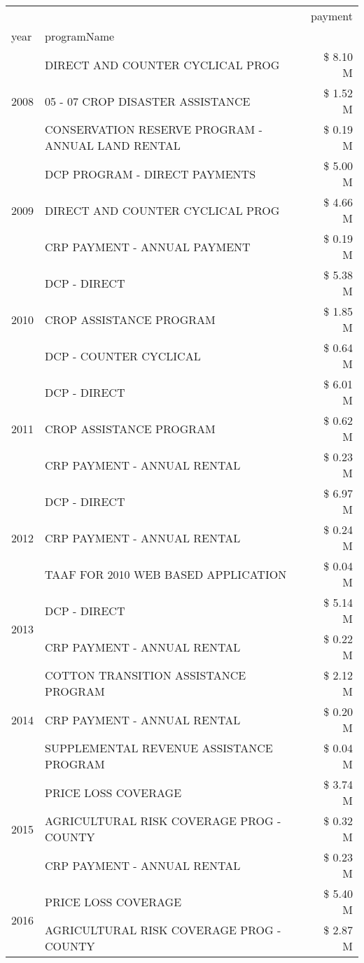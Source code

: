 \begin{tabular}{llr}
\toprule
 &  & payment \\
year & programName &  \\
\midrule
\multirow[t]{3}{*}{2008} & DIRECT AND COUNTER CYCLICAL PROG & \$ 8.10 M \\
 & 05 - 07 CROP DISASTER ASSISTANCE & \$ 1.52 M \\
 & CONSERVATION RESERVE PROGRAM - ANNUAL LAND RENTAL & \$ 0.19 M \\
\cline{1-3}
\multirow[t]{3}{*}{2009} & DCP PROGRAM - DIRECT PAYMENTS & \$ 5.00 M \\
 & DIRECT AND COUNTER CYCLICAL PROG & \$ 4.66 M \\
 & CRP PAYMENT - ANNUAL PAYMENT & \$ 0.19 M \\
\cline{1-3}
\multirow[t]{3}{*}{2010} & DCP - DIRECT & \$ 5.38 M \\
 & CROP ASSISTANCE PROGRAM & \$ 1.85 M \\
 & DCP - COUNTER CYCLICAL & \$ 0.64 M \\
\cline{1-3}
\multirow[t]{3}{*}{2011} & DCP - DIRECT & \$ 6.01 M \\
 & CROP ASSISTANCE PROGRAM & \$ 0.62 M \\
 & CRP PAYMENT - ANNUAL RENTAL & \$ 0.23 M \\
\cline{1-3}
\multirow[t]{3}{*}{2012} & DCP - DIRECT & \$ 6.97 M \\
 & CRP PAYMENT - ANNUAL RENTAL & \$ 0.24 M \\
 & TAAF FOR 2010 WEB BASED APPLICATION & \$ 0.04 M \\
\cline{1-3}
\multirow[t]{2}{*}{2013} & DCP - DIRECT & \$ 5.14 M \\
 & CRP PAYMENT - ANNUAL RENTAL & \$ 0.22 M \\
\cline{1-3}
\multirow[t]{3}{*}{2014} & COTTON TRANSITION ASSISTANCE PROGRAM & \$ 2.12 M \\
 & CRP PAYMENT - ANNUAL RENTAL & \$ 0.20 M \\
 & SUPPLEMENTAL REVENUE ASSISTANCE PROGRAM & \$ 0.04 M \\
\cline{1-3}
\multirow[t]{3}{*}{2015} & PRICE LOSS COVERAGE & \$ 3.74 M \\
 & AGRICULTURAL RISK COVERAGE PROG - COUNTY & \$ 0.32 M \\
 & CRP PAYMENT - ANNUAL RENTAL & \$ 0.23 M \\
\cline{1-3}
\multirow[t]{3}{*}{2016} & PRICE LOSS COVERAGE & \$ 5.40 M \\
 & AGRICULTURAL RISK COVERAGE PROG - COUNTY & \$ 2.87 M \\

\end{tabular}
